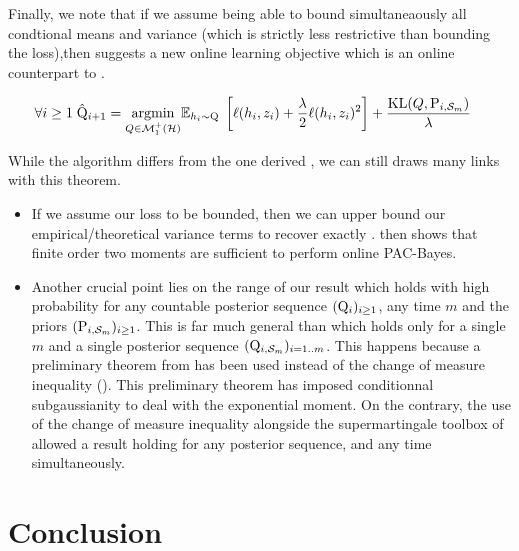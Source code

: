 Finally, we note that if we assume being able to bound simultaneaously all condtional means and variance (which is strictly less restrictive than bounding the loss),then   suggests a new online learning objective which is an online counterpart to .

\begin{align}
    \forall i\geq1\; \hat{\mathrm{Q}}_{i+1}&= \underset{Q\in\mathcal{M}^+_1(\mathcal{H})}{\mathrm{argmin}} \mathbb{E}_{h_i\sim \mathrm{Q}} \; \left[\ell(h_i,z_i)+ \frac{\lambda}{2}\ell(h_i,z_i)^2\right] + \frac{\operatorname{KL}(Q, \mathrm{P}_{i,\mathcal{S}_m})}{\lambda}
\end{align}

While the algorithm differs from the one derived , we can still draws many links with this theorem.

\begin{itemize}
  \item If we assume our loss to be bounded, then we can upper bound our empirical/theoretical variance terms to recover exactly .  then shows that finite order two moments are sufficient to perform online PAC-Bayes.
  \item Another crucial point lies on the range of our result which holds with high probability for any countable posterior sequence $(\mathrm{Q}_{i})_{i\geq 1}$, any time $m$ and the priors $(\mathrm{P}_{i,\mathcal{S}_m})_{i\geq 1}$.
  This is far much general than  which holds only for a single $m$ and a single posterior sequence $(\mathrm{Q}_{i,\mathcal{S}_m})_{i=1..m}$. This happens because a preliminary theorem from \citet{rivasplata2020pac} has been used instead of the change of measure inequality (). This preliminary theorem has imposed conditionnal subgaussianity to deal with the exponential moment. On the contrary, the use of the change of measure inequality alongside the supermartingale toolbox of  allowed a result holding for any posterior sequence, and any time simultaneously.
\end{itemize}






 \section{Conclusion}

